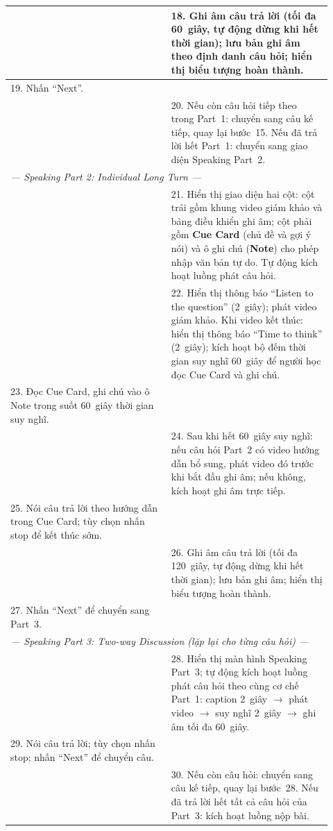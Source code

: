\begin{longtable}{|p{0.46\linewidth}|p{0.46\linewidth}|}
    & 18. Ghi âm câu trả lời (tối đa 60~giây, tự động dừng khi hết thời gian); lưu bản ghi âm theo định danh câu hỏi; hiển thị biểu tượng hoàn thành. \\ \hline
    19. Nhấn ``Next''. & \\ \hline
    & 20. Nếu còn câu hỏi tiếp theo trong Part~1: chuyển sang câu kế tiếp, quay lại bước~15. Nếu đã trả lời hết Part~1: chuyển sang giao diện Speaking Part~2. \\ \hline
    \multicolumn{2}{|l|}{\textit{--- Speaking Part 2: Individual Long Turn ---}} \\ \hline
    & 21. Hiển thị giao diện hai cột: cột trái gồm khung video giám khảo và bảng điều khiển ghi âm; cột phải gồm \textbf{Cue Card} (chủ đề và gợi ý nói) và ô ghi chú (\textbf{Note}) cho phép nhập văn bản tự do. Tự động kích hoạt luồng phát câu hỏi. \\ \hline
    & 22. Hiển thị thông báo ``Listen to the question'' (2~giây); phát video giám khảo. Khi video kết thúc: hiển thị thông báo ``Time to think'' (2~giây); kích hoạt bộ đếm thời gian suy nghĩ 60~giây để người học đọc Cue Card và ghi chú. \\ \hline
    23. Đọc Cue Card, ghi chú vào ô Note trong suốt 60~giây thời gian suy nghĩ. & \\ \hline
    & 24. Sau khi hết 60~giây suy nghĩ: nếu câu hỏi Part~2 có video hướng dẫn bổ sung, phát video đó trước khi bắt đầu ghi âm; nếu không, kích hoạt ghi âm trực tiếp. \\ \hline
    25. Nói câu trả lời theo hướng dẫn trong Cue Card; tùy chọn nhấn stop để kết thúc sớm. & \\ \hline
    & 26. Ghi âm câu trả lời (tối đa 120~giây, tự động dừng khi hết thời gian); lưu bản ghi âm; hiển thị biểu tượng hoàn thành. \\ \hline
    27. Nhấn ``Next'' để chuyển sang Part~3. & \\ \hline
    \multicolumn{2}{|l|}{\textit{--- Speaking Part 3: Two-way Discussion (lặp lại cho từng câu hỏi) ---}} \\ \hline
    & 28. Hiển thị màn hình Speaking Part~3; tự động kích hoạt luồng phát câu hỏi theo cùng cơ chế Part~1: caption 2~giây $\to$ phát video $\to$ suy nghĩ 2~giây $\to$ ghi âm tối đa 60~giây. \\ \hline
    29. Nói câu trả lời; tùy chọn nhấn stop; nhấn ``Next'' để chuyển câu. & \\ \hline
    & 30. Nếu còn câu hỏi: chuyển sang câu kế tiếp, quay lại bước~28. Nếu đã trả lời hết tất cả câu hỏi của Part~3: kích hoạt luồng nộp bài. \\ \hline

\end{longtable}
